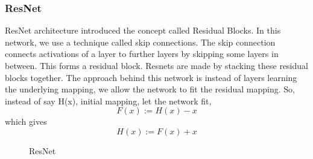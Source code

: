         \subsubsection{ResNet}
            ResNet\cite{DBLP:journals/corr/HeZRS15} architecture introduced the concept called Residual Blocks. In this network, we use a technique called skip connections. The skip connection connects activations of a  layer to further layers by skipping some layers in between. This forms a residual block. Resnets are made by stacking these residual blocks together. The approach behind this network is instead of layers learning the underlying mapping, we allow the network to fit the residual mapping. So, instead of say H(x), initial mapping, let the network fit,
            \begin{equation}
                F(x) := H(x) - x
            \end{equation}
            which gives
            \begin{equation}
                H(x) := F(x) + x
            \end{equation}
            \begin{figure}[hbt!]
                \caption{ResNet} \cite{enwiki:1205293224}
            \end{figure}

        \newpage
